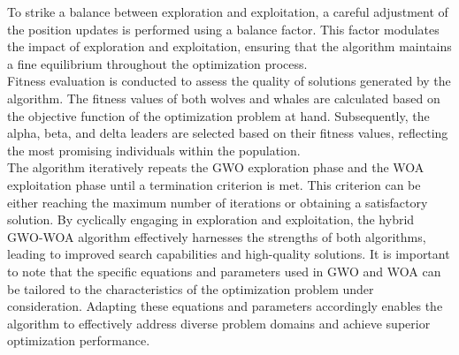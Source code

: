 \documentclass{article}
\begin{document}
To strike a balance between exploration and exploitation, a careful adjustment of the position updates is performed using a balance factor. This factor modulates the impact of exploration and exploitation, ensuring that the algorithm maintains a fine equilibrium throughout the optimization process.\\
Fitness evaluation is conducted to assess the quality of solutions generated by the algorithm. The fitness values of both wolves and whales are calculated based on the objective function of the optimization problem at hand. Subsequently, the alpha, beta, and delta leaders are selected based on their fitness values, reflecting the most promising individuals within the population.\\
The algorithm iteratively repeats the GWO exploration phase and the WOA exploitation phase until a termination criterion is met. This criterion can be either reaching the maximum number of iterations or obtaining a satisfactory solution. By cyclically engaging in exploration and exploitation, the hybrid GWO-WOA algorithm effectively harnesses the strengths of both algorithms, leading to improved search capabilities and high-quality solutions. It is important to note that the specific equations and parameters used in GWO and WOA can be tailored to the characteristics of the optimization problem under consideration. Adapting these equations and parameters accordingly enables the algorithm to effectively address diverse problem domains and achieve superior optimization performance.\\
\end{document}
